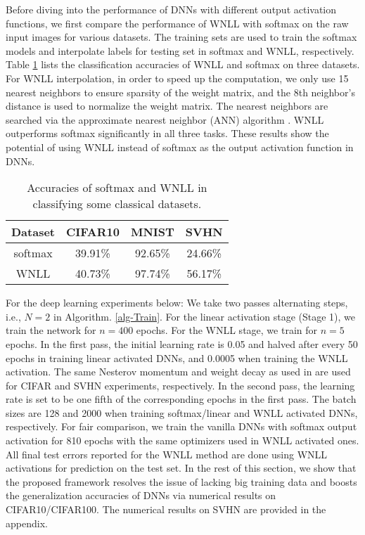 \documentclass{article}
\begin{document}
Before diving into the performance of DNNs with different output activation functions, we first compare the performance of WNLL with softmax on the raw input images for various datasets. The training sets are used to train the softmax models and interpolate labels for testing set in softmax and WNLL, respectively. Table \ref{Simple-Classifiers} lists the classification accuracies of WNLL and softmax on three datasets.
For WNLL interpolation, in order to speed up the computation, we only use 15 nearest neighbors to ensure sparsity of the weight matrix, and the 8th neighbor's distance is used to normalize the weight matrix. The nearest neighbors are searched via the approximate nearest neighbor (ANN) algorithm \cite{ANN:2014}. WNLL outperforms softmax significantly in all three tasks. These results show the potential of using WNLL instead of softmax as the output activation function in DNNs.



\begin{table}[!h]
\renewcommand{\arraystretch}{1.3}
\centering
\caption{Accuracies of softmax and WNLL in classifying some classical datasets.}
\label{Simple-Classifiers}
\centering
\begin{tabular}{cccc}
\hline
\footnotesize{Dataset} & \footnotesize{CIFAR10} & \footnotesize{MNIST} & \footnotesize{SVHN}\\
\hline
softmax & 39.91\%  & 92.65\%   & 24.66\% \\
WNLL    & 40.73\%  & 97.74\%   & 56.17\% \\
\hline
\end{tabular}
\end{table}

For the deep learning experiments below: We take two passes alternating steps, i.e., $N=2$ in Algorithm. \ref{alg-Train}. For the linear activation stage (Stage 1), we train the network for $n=400$ epochs. For the WNLL stage, we train for $n=5$ epochs. In the first pass, the initial learning rate is 0.05 and halved after every 50 epochs in training linear activated DNNs, and 0.0005 when training the WNLL activation. The same Nesterov momentum and weight decay as used in \cite{ResNet,Huang:2016ECCV} are used for CIFAR and SVHN experiments, respectively. In the second pass, the learning rate is set to be one fifth of the corresponding epochs in the first pass. The batch sizes are 128 and 2000 when training softmax/linear and WNLL activated DNNs, respectively. For fair comparison, we train the vanilla DNNs with softmax output activation for 810 epochs with the same optimizers used in WNLL activated ones. All final test errors reported for the WNLL method are done using WNLL activations for prediction on  the test set. In the rest of this section, we show that the proposed framework resolves the issue of lacking big training data and boosts the generalization accuracies of DNNs via numerical results on CIFAR10/CIFAR100. The numerical results on SVHN are provided in the appendix.
\end{document}
